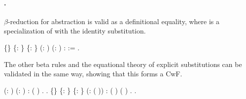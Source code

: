   \paragraph{.}
  $\beta$-reduction for abstraction is valid as a definitional equality,
  where  is a specialization of  with the identity substitution.
\begin{coqdoccode}
\coqdocemptyline
\coqdocnoindent
{}  \{\} \{: \} \{: \} (: ) (: ) \coqdoceol
\coqdocindent{1.00em}
: \coqdocnotation{[}  \coqdocnotation{$\star$} \coqdocnotation{]} \coqdocnotation{=} \coqdocnotation{[} \coqdocnotation{$\circ$}  \coqdocnotation{]} :=  \coqdocvar{\_}.\coqdoceol
\coqdocemptyline
\end{coqdoccode}
 \noindent 
  The other beta rules and the equational theory of 
  explicit substitutions can be validated in the same way, showing that
  this forms a CwF.
\begin{coqdoccode}
\coqdocemptyline
\coqdocemptyline
\coqdocnoindent
{}   (: ) (: )\coqdoceol
\coqdocnoindent
: \coqdocdefinition{$\Lambda$} (\coqdocnotation{(} \coqdocnotation{$\circ$} \coqdocnotation{)} \coqdocnotation{\{\{} \coqdocnotation{\}\}})  .\coqdoceol
\coqdocnoindent
{}.\coqdoceol
\coqdocemptyline
\coqdocnoindent
{}  \{\} \{: \} \{: \} (: ( ))\coqdoceol
\coqdocnoindent
:  (  \coqdocnotation{$\star$}  \coqdocvar{\_})   ( )  .\coqdoceol
\coqdocnoindent
{}.\coqdoceol
\coqdocemptyline
\end{coqdoccode}
